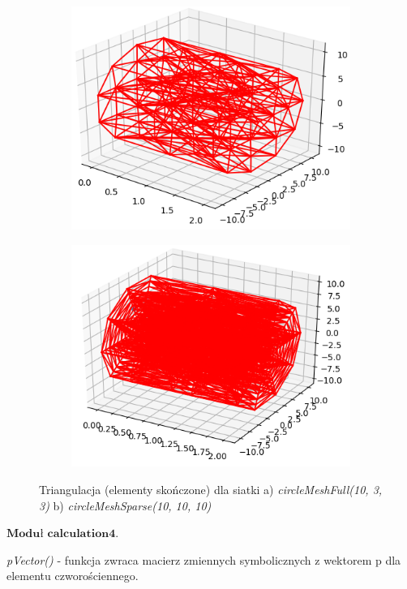 \begin{figure}
\begin{subfigure}{.5\textwidth}
  \centering
  \includegraphics[width=.8\linewidth]{Zdjecia/5/triangulation1}
  \caption{}
  \label{fig:sfig1}
\end{subfigure}%
\begin{subfigure}{.5\textwidth}
  \centering
  \includegraphics[width=.8\linewidth]{Zdjecia/5/triangulation2}
  \caption{}
  \label{fig:sfig2}
\end{subfigure}

\caption{Triangulacja (elementy skończone) dla siatki a) \textit{circleMeshFull(10, 3, 3)} b) \textit{circleMeshSparse(10, 10, 10)}}
\label{fig:triangulation}
\end{figure}

\vspace {3mm}
 \( \textbf{Moduł calculation4} \).

\vspace {3mm}
\textit{pVector()} - funkcja zwraca macierz zmiennych symbolicznych z wektorem p dla elementu czworościennego.

